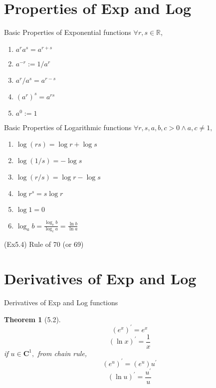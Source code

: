 \documentclass[final]{beamer}
\newtheorem{thm}{Theorem}
\begin{document}
\section{Properties of Exp and Log} %
\label{sec:properties_of_exp_and_log}
\begin{frame}[t]{Basic Properties of Exponential functions}
	$\forall r,s \in \mathbb{R}$,
	\begin{enumerate}
		\item $a^r a^s = a^{r+s}$
		\item $a^{-r} := 1/a^r$
		\item $a^r/a^s = a^{r-s}$
		\item $(a^r)^s=a^{rs}$
		\item $a^0 := 1$
	\end{enumerate}

\end{frame}



\begin{frame}[t]{Basic Properties of Logarithmic functions}
	$\forall r,s,a,b,c >0 \land a,c\neq 1,$
	\begin{enumerate}
		\item $\log(rs)=\log r + \log s$
		\item $\log(1/s)=-\log s$
		\item $\log(r/s) = \log r - \log s$
		\item $\log r^s = s\log r$
		\item $\log 1 = 0$
		\item $\log_a b = \frac{\log_c b }{\log_c a}= \frac{\ln b}{\ln a}$
	\end{enumerate}
	
(Ex5.4) Rule of 70 (or 69)
\end{frame}
	
\section{Derivatives of Exp and Log} %
\label{sec:derivatives_of_exp_and_log}
\begin{frame}[t]{Derivatives of Exp and Log functions}
	\begin{thm}
		[5.2]
		\[
			(e^x)^\prime = e^x
		\]\[
			(\ln x)^\prime = \frac 1 x 
		\]if $u\in \mathbf{C}^1,$ from chain rule,\[
			\left(e^{u}\right)^\prime = \left(e^{u}\right)u^\prime
		\]\[
			(\ln u )^\prime = \frac {u^\prime} {u }\tag{$u>0$}
		\]
	\end{thm}
\end{frame}
\end{document}
